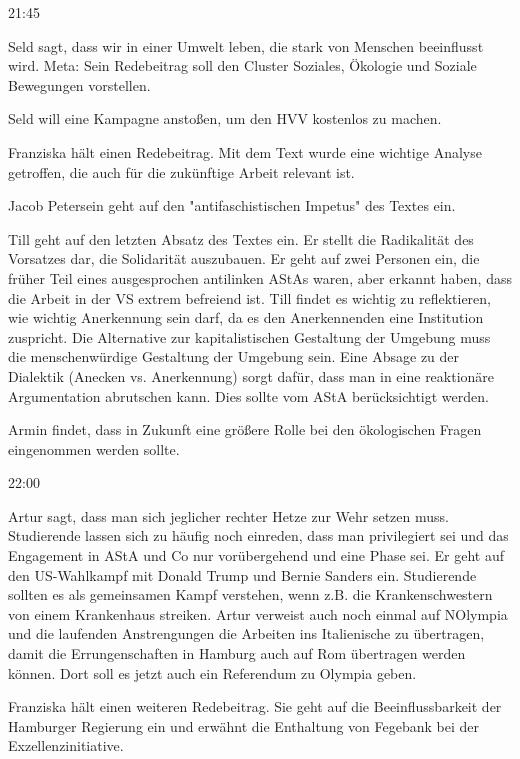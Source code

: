 \documentclass[ngerman,headheight=70pt]{scrartcl}
\begin{document}
    21:45

    Seld sagt, dass wir in einer Umwelt leben, die stark von Menschen beeinflusst
    wird. Meta: Sein Redebeitrag soll den Cluster Soziales, Ökologie und Soziale
    Bewegungen vorstellen.

    Seld will eine Kampagne anstoßen, um den HVV kostenlos zu machen.

    Franziska hält einen Redebeitrag. Mit dem Text wurde eine wichtige Analyse
    getroffen, die auch für die zukünftige Arbeit relevant ist.

    Jacob Petersein geht auf den "antifaschistischen Impetus" des Textes
    ein.

    Till geht auf den letzten Absatz des Textes ein. Er stellt die Radikalität
    des Vorsatzes dar, die Solidarität auszubauen. Er geht auf zwei Personen
    ein, die früher Teil eines ausgesprochen antilinken AStAs waren, aber erkannt
    haben, dass die Arbeit in der VS extrem befreiend ist. Till findet es wichtig
    zu reflektieren, wie wichtig Anerkennung sein darf, da es den Anerkennenden
    eine Institution zuspricht. Die Alternative zur kapitalistischen Gestaltung
    der Umgebung muss die menschenwürdige Gestaltung der Umgebung sein. Eine
    Absage zu der Dialektik (Anecken vs. Anerkennung) sorgt dafür, dass
    man in eine reaktionäre Argumentation abrutschen kann. Dies sollte vom
    AStA berücksichtigt werden.

    Armin findet, dass in Zukunft eine größere Rolle bei den ökologischen
    Fragen eingenommen werden sollte.

    22:00

    Artur sagt, dass man sich jeglicher rechter Hetze zur Wehr setzen muss.
    Studierende lassen sich zu häufig noch einreden, dass man privilegiert
    sei und das Engagement in AStA und Co nur vorübergehend und eine Phase
    sei. Er geht auf den US-Wahlkampf mit Donald Trump und Bernie Sanders ein.
    Studierende sollten es als gemeinsamen Kampf verstehen, wenn z.B. die Krankenschwestern
    von einem Krankenhaus streiken.
    Artur verweist auch noch einmal auf NOlympia und die laufenden Anstrengungen
    die Arbeiten ins Italienische zu übertragen, damit die Errungenschaften
    in Hamburg auch auf Rom übertragen werden können. Dort soll es jetzt auch
    ein Referendum zu Olympia geben.

    Franziska hält einen weiteren Redebeitrag. Sie geht auf die Beeinflussbarkeit
    der Hamburger Regierung ein und erwähnt die Enthaltung von Fegebank
    bei der Exzellenzinitiative.
\end{document}
